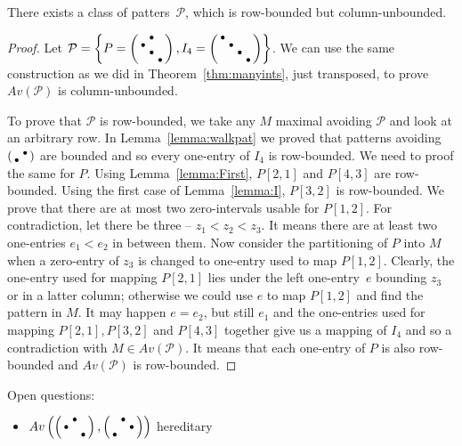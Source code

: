 \begin{lemma}
There exists a class of patters~$\mathcal{P}$, which is row-bounded but column-unbounded.
\end{lemma}
\begin{proof}
Let $\mathcal{P}=\left\lbrace P=\left(\begin{smallmatrix} &\bullet& \\\bullet& & \\ &\bullet& \\ & &\bullet\end{smallmatrix}\right),I_4=\left(\begin{smallmatrix}\bullet& & & \\ &\bullet& & \\ & &\bullet& \\ & & &\bullet\end{smallmatrix}\right)\right\rbrace$. We can use the same construction as we did in Theorem~\ref{thm:manyints}, just transposed, to prove $Av(\mathcal{P})$ is column-unbounded.

To prove that $\mathcal{P}$ is row-bounded, we take any $M$ maximal avoiding $\mathcal{P}$ and look at an arbitrary row. In Lemma~\ref{lemma:walkpat} we proved that patterns avoiding $\left(\begin{smallmatrix} &\bullet\\\bullet& \end{smallmatrix}\right)$ are bounded and so every one-entry of $I_4$ is row-bounded. We need to proof the same for $P$. Using Lemma~\ref{lemma:First}, $P[2,1]$ and $P[4,3]$ are row-bounded. Using the first case of Lemma~\ref{lemma:I}, $P[3,2]$ is row-bounded. We prove that there are at most two zero-intervals usable for $P[1,2]$. For contradiction, let there be three -- $z_1<z_2<z_3$. It means there are at least two one-entries $e_1<e_2$ in between them. Now consider the partitioning of $P$ into $M$ when a zero-entry of $z_3$ is changed to one-entry used to map $P[1,2]$. Clearly, the one-entry used for mapping $P[2,1]$ lies under the left one-entry~$e$ bounding $z_3$ or in a latter column; otherwise we could use $e$ to map $P[1,2]$ and find the pattern in $M$. It may happen $e=e_2$, but still $e_1$ and the one-entries used for mapping $P[2,1],P[3,2]$ and $P[4,3]$ together give us a mapping of $I_4$ and so a contradiction with $M\in Av(\mathcal{P})$. It means that each one-entry of $P$ is also row-bounded and $Av(\mathcal{P})$ is row-bounded.
\end{proof}

Open questions:
\begin{itemize}
	\item $Av\left(\left(\begin{smallmatrix} &\bullet& \\\bullet& & \\ & &\bullet\end{smallmatrix}\right),\left(\begin{smallmatrix} &\bullet& \\ & &\bullet\\\bullet& & \end{smallmatrix}\right)\right)$ hereditary
\end{itemize}